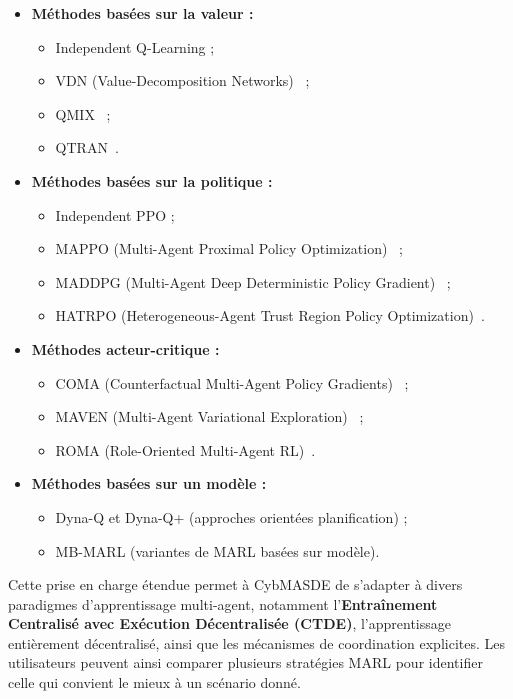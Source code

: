 \documentclass[pdflatex,sn-mathphys-num]{sn-jnl}%
\theoremstyle{thmstyleone}%
\theoremstyle{thmstyletwo}%
\theoremstyle{thmstylethree}%
\begin{document}
\begin{itemize}
    \item \textbf{Méthodes basées sur la valeur :}
    \begin{itemize}
        \item Independent Q-Learning ;
        \item VDN (Value-Decomposition Networks)~\cite{sunehag2018vdn} ;
        \item QMIX~\cite{rashid2018qmix} ;
        \item QTRAN~\cite{son2019qtran}.
    \end{itemize}
    
    \item \textbf{Méthodes basées sur la politique :}
    \begin{itemize}
        \item Independent PPO ;
        \item MAPPO (Multi-Agent Proximal Policy Optimization)~\cite{yu2021mappo} ;
        \item MADDPG (Multi-Agent Deep Deterministic Policy Gradient)~\cite{lowe2017multi} ;
        \item HATRPO (Heterogeneous-Agent Trust Region Policy Optimization)~\cite{kuba2021trust}.
    \end{itemize}
    
    \item \textbf{Méthodes acteur-critique :}
    \begin{itemize}
        \item COMA (Counterfactual Multi-Agent Policy Gradients)~\cite{foerster2018counterfactual} ;
        \item MAVEN (Multi-Agent Variational Exploration)~\cite{mahajan2019maven} ;
        \item ROMA (Role-Oriented Multi-Agent RL)~\cite{wang2020roma}.
    \end{itemize}
    
    \item \textbf{Méthodes basées sur un modèle :}
    \begin{itemize}
        \item Dyna-Q et Dyna-Q+ (approches orientées planification) ;
        \item MB-MARL (variantes de MARL basées sur modèle).
    \end{itemize}
\end{itemize}

Cette prise en charge étendue permet à CybMASDE de s'adapter à divers paradigmes d'apprentissage multi-agent, notamment l'\textbf{Entraînement Centralisé avec Exécution Décentralisée (CTDE)}, l'apprentissage entièrement décentralisé, ainsi que les mécanismes de coordination explicites. Les utilisateurs peuvent ainsi comparer plusieurs stratégies MARL pour identifier celle qui convient le mieux à un scénario donné.
\end{document}
